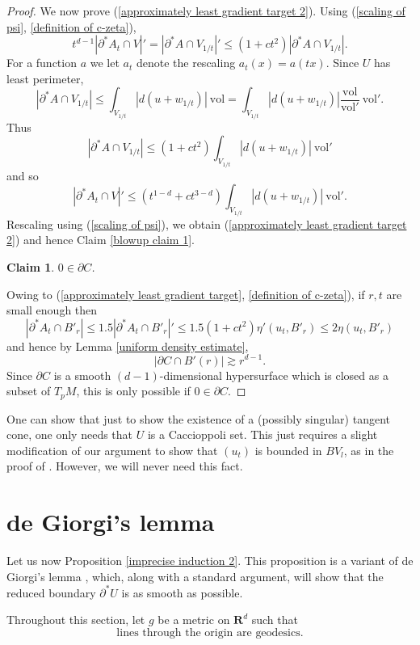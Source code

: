 \documentclass[reqno,12pt,letterpaper]{amsart}
\newcommand{\RR}{\mathbf{R}}
\newcommand{\vol}{\mathrm{vol}}
\newtheorem{claim}[theorem]{Claim}
\theoremstyle{definition}
\numberwithin{equation}{section}
\begin{document}
\begin{proof}
We now prove (\ref{approximately least gradient target 2}).
Using (\ref{scaling of psi}, \ref{definition of c-zeta}),
$$t^{d - 1} | \partial^* A_t \cap V|' = |\partial^* A \cap V_{1/t}|' \leq (1 + ct^2) |\partial^* A \cap V_{1/t}|.$$
For a function $a$ we let $a_t$ denote the rescaling $a_t(x) = a(tx)$.
Since $U$ has least perimeter,
$$|\partial^* A \cap V_{1/t}| \leq \int_{V_{1/t}} |d(u + w_{1/t})| ~\vol = \int_{V_{1/t}} |d(u + w_{1/t})| \frac{\vol}{\vol'} ~\vol'.$$
Thus
$$|\partial^* A \cap V_{1/t}| \leq (1 + ct^2) \int_{V_{1/t}} |d(u + w_{1/t})| ~\vol'$$
and so
$$|\partial^* A_t \cap V|' \leq (t^{1 - d} + ct^{3 - d}) \int_{V_{1/t}} |d(u + w_{1/t})| ~\vol'.$$
Rescaling using (\ref{scaling of psi}), we obtain (\ref{approximately least gradient target 2}) and hence Claim \ref{blowup claim 1}.

\begin{claim}
$0 \in \partial C$.
\end{claim}

Owing to (\ref{approximately least gradient target}, \ref{definition of c-zeta}), if $r,t$ are small enough then
$$|\partial^* A_t \cap B'_r| \leq 1.5|\partial^* A_t \cap B'_r|' \leq 1.5(1 + ct^2) \eta'(u_t, B'_r) \leq 2 \eta(u_t, B'_r)$$
and hence by Lemma \ref{uniform density estimate},
$$|\partial C \cap B'(r)| \gtrsim r^{d - 1}.$$
Since $\partial C$ is a smooth $(d-1)$-dimensional hypersurface which is closed as a subset of $T_pM$, this is only possible if $0 \in \partial C$.
\end{proof}

One can show that just to show the existence of a (possibly singular) tangent cone, one only needs that $U$ is a Caccioppoli set.
This just requires a slight modification of our argument to show that $(u_t)$ is bounded in $BV_l$, as in the proof of \cite[Theorem 9.3]{Giusti77}.
However, we will never need this fact.

\section{de Giorgi's lemma}\label{de Giorgi section}
Let us now Proposition \ref{imprecise induction 2}.
This proposition is a variant of de Giorgi's lemma \cite{deGiorgi61}, which, along with a standard argument, will show that the reduced boundary $\partial^* U$ is as smooth as possible.

Throughout this section, let $g$ be a metric on $\RR^d$ such that
\begin{equation}
\text{lines through the origin are geodesics}.
\end{equation}
\end{document}

